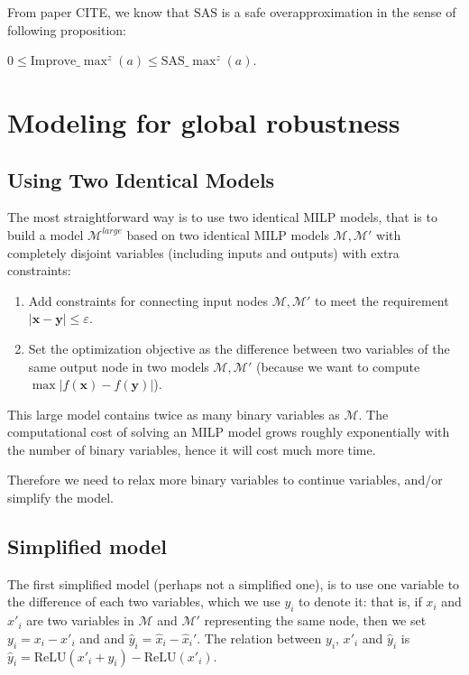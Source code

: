 \documentclass{llncs}
\newcommand{\Improve}{\mathrm{Improve}}
\newcommand{\Utility}{\mathrm{SAS}}
\newcommand{\ReLU}{\mathrm{ReLU}}
\begin{document}
	From paper CITE, we know that $\Utility$ is a safe overapproximation in the sense of following proposition:
	
	\begin{proposition}
		$0 \leq \Improve\_\max^z(a) \leq \Utility\_\max^z(a)$. 
	\end{proposition}
	
	
	\section{Modeling for global robustness}
	

	
	\subsection{Using Two Identical Models}
	The most straightforward way is to use two identical MILP models, that is to build a model $\mathcal{M}^{large}$ based on two identical MILP models $\mathcal{M},\mathcal{M}'$ with completely disjoint variables (including inputs and outputs) with extra constraints:
	\begin{enumerate}
		\item Add constraints for connecting input nodes $\mathcal{M},\mathcal{M}'$ to meet the requirement $|\boldsymbol{x}-\boldsymbol{y}| \leq \varepsilon$.
		\item Set the optimization objective as the difference between two variables of the same output node in two models $\mathcal{M},\mathcal{M}'$ (because we want to compute $\max|f(\boldsymbol{x}) -f(\boldsymbol{y}) |$).
	\end{enumerate}
	This large model contains twice as many binary variables as $\mathcal{M}$. The computational cost of solving an MILP model grows roughly exponentially with the number of binary variables, hence it will cost much more time.
	
	Therefore we need to relax more binary variables to continue variables, and/or simplify the model.
	
	\subsection{Simplified model}
	
	The first simplified model (perhaps not a simplified one), is to use one variable to the difference of each two variables, which we use $y_i$ to  denote it: that is, if $x_i$ and $x'_i$ are two variables in $\mathcal{M}$ and $\mathcal{M}'$ representing the same node, then we set $y_i=x_i-x'_i$ and and $\hat{y}_i=\hat{x}_i-\hat{x}_i'$. The relation between $y_i$, $x'_i$ and $\hat{y}_i$ is $\hat{y}_i = \ReLU(x'_i+y_i)-\ReLU(x'_i).$ 
	
\end{document}
